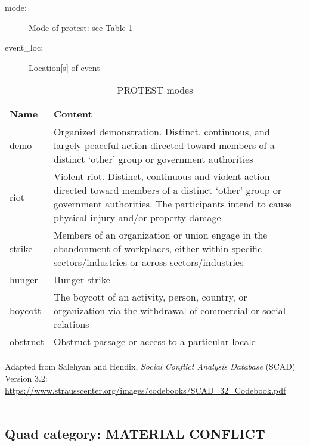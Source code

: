 \documentclass[11pt]{report}
\begin{document}
\begin{description}
	\item[mode:] Mode of protest: see Table \ref{tab:protestmode}
	\item[event\_loc:] Location[s] of event
\end{description}



\begin{table}[htp]
\caption{PROTEST modes}
\begin{center}
\begin{tabular}{|l|p{13cm}|}
\hline
Name & Content \\
\hline
demo & Organized demonstration. Distinct, continuous, and largely peaceful action directed toward
members of a distinct `other' group or government authorities  \\
riot & Violent riot. Distinct, continuous and violent action directed toward members of
a distinct `other' group or government authorities. The participants intend to cause physical injury and/or property damage \\
strike & Members of an organization or union engage in the abandonment of
workplaces, either within specific sectors/industries or across sectors/industries\\
hunger & Hunger strike\\
boycott & The boycott of an activity, person, country, or organization via the withdrawal of commercial or social relations\\
obstruct & Obstruct passage or access to a particular locale \\
\hline
\end{tabular}
\end{center}
\label{tab:protestmode}
\raggedright{Adapted from Salehyan and Hendix, \textit{Social Conflict Analysis Database} (SCAD)
Version 3.2: \url{https://www.strausscenter.org/images/codebooks/SCAD\_32\_Codebook.pdf}}\\~

\end{table}%

\subsection{Quad category: MATERIAL CONFLICT}
\end{document}
